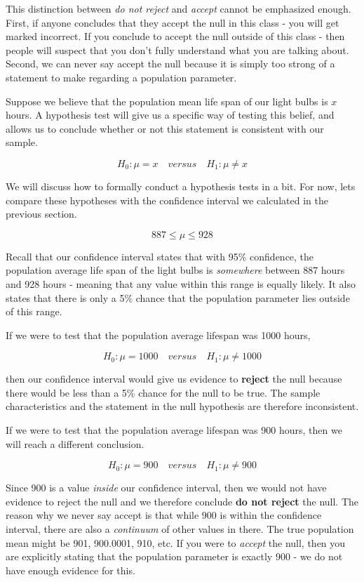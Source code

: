 \documentclass[
]{book}
\begin{document}
This distinction between \emph{do not reject} and \emph{accept} cannot be emphasized enough. First, if anyone concludes that they accept the null in this class - you will get marked incorrect. If you conclude to accept the null outside of this class - then people will suspect that you don't fully understand what you are talking about. Second, we can never say accept the null because it is simply too strong of a statement to make regarding a population parameter.

Suppose we believe that the population mean life span of our light bulbs is \(x\) hours. A hypothesis test will give us a specific way of testing this belief, and allows us to conclude whether or not this statement is consistent with our sample.

\[H_0:\mu=x \quad versus \quad H_1:\mu\neq x\]

We will discuss how to formally conduct a hypothesis tests in a bit. For now, lets compare these hypotheses with the confidence interval we calculated in the previous section.

\[887 \leq \mu \leq 928\]

Recall that our confidence interval states that with 95\% confidence, the population average life span of the light bulbs is \emph{somewhere} between 887 hours and 928 hours - meaning that any value within this range is equally likely. It also states that there is only a 5\% chance that the population parameter lies outside of this range.

If we were to test that the population average lifespan was 1000 hours,

\[H_0:\mu=1000 \quad versus \quad H_1:\mu\neq 1000\]

then our confidence interval would give us evidence to \textbf{reject} the null because there would be less than a 5\% chance for the null to be true. The sample characteristics and the statement in the null hypothesis are therefore inconsistent.

If we were to test that the population average lifespan was 900 hours, then we will reach a different conclusion.

\[H_0:\mu=900 \quad versus \quad H_1:\mu\neq 900\]

Since 900 is a value \emph{inside} our confidence interval, then we would not have evidence to reject the null and we therefore conclude \textbf{do not reject} the null. The reason why we never say accept is that while 900 is within the confidence interval, there are also a \emph{continuum} of other values in there. The true population mean might be 901, 900.0001, 910, etc. If you were to \emph{accept} the null, then you are explicitly stating that the population parameter is exactly 900 - we do not have enough evidence for this.
\end{document}
